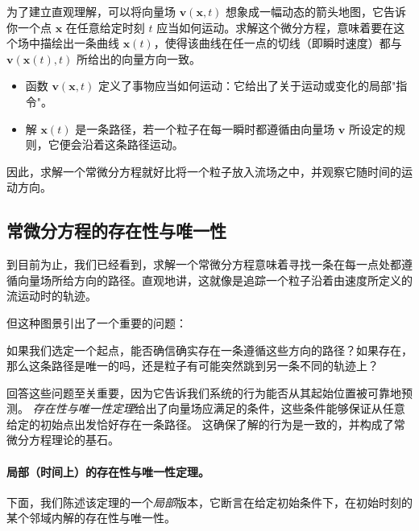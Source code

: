 为了建立直观理解，可以将向量场 $\mathbf{v}(\mathbf{x}, t)$ 想象成一幅动态的箭头地图，它告诉你一个点 $\mathbf{x}$ 在任意给定时刻 $t$ 应当如何运动。求解这个微分方程，意味着要在这个场中描绘出一条曲线 $\mathbf{x}(t)$，使得该曲线在任一点的切线（即瞬时速度）都与 $\mathbf{v}(\mathbf{x}(t), t)$ 所给出的向量方向一致。
\begin{itemize}
    \item {} 函数 $\mathbf{v}(\mathbf{x}, t)$ 定义了事物应当如何运动：它给出了关于运动或变化的局部"指令"。
    \item {} 解 $\mathbf{x}(t)$ 是一条路径，若一个粒子在每一瞬时都遵循由向量场 $\mathbf{v}$ 所设定的规则，它便会沿着这条路径运动。
\end{itemize}
因此，求解一个常微分方程就好比将一个粒子放入流场之中，并观察它随时间的运动方向。

\subsection{常微分方程的存在性与唯一性}
到目前为止，我们已经看到，求解一个常微分方程意味着寻找一条在每一点处都遵循向量场所给方向的路径。直观地讲，这就像是追踪一个粒子沿着由速度所定义的流运动时的轨迹。

但这种图景引出了一个重要的问题：
\begin{question}
    如果我们选定一个起点，能否确信确实存在一条遵循这些方向的路径？如果存在，那么这条路径是唯一的吗，还是粒子有可能突然跳到另一条不同的轨迹上？
\end{question}

回答这些问题至关重要，因为它告诉我们系统的行为能否从其起始位置被可靠地预测。
\emph{存在性与唯一性定理}给出了向量场应满足的条件，这些条件能够保证从任意给定的初始点出发恰好存在一条路径。
这确保了解的行为是一致的，并构成了常微分方程理论的基石。


\paragraph{局部（时间上）的存在性与唯一性定理。}


下面，我们陈述该定理的一个\emph{局部}版本，它断言在给定初始条件下，在初始时刻的某个邻域内解的存在性与唯一性。

